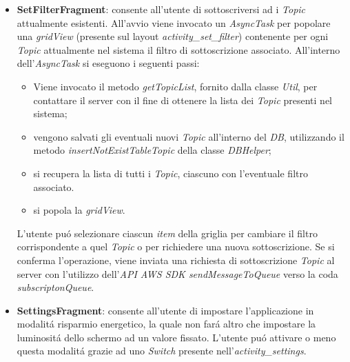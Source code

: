 \documentclass{article}
\begin{document}
\begin{itemize}
\item \textbf{SetFilterFragment}: consente all'utente di sottoscriversi ad i \textit{Topic} attualmente esistenti. All'avvio viene invocato un \textit{AsyncTask} per popolare una \textit{gridView} (presente sul layout \textit{activity\_set\_filter}) contenente per ogni \textit{Topic} attualmente nel sistema il filtro di sottoscrizione associato. All'interno dell'\textit{AsyncTask} si eseguono i seguenti passi:
\begin{itemize}
\item 	Viene invocato il metodo \textit{getTopicList}, fornito dalla classe \textit{Util}, per contattare il server con il fine di ottenere la lista dei \textit{Topic} presenti nel sistema;
\item	vengono salvati gli eventuali nuovi \textit{Topic} all'interno del \textit{DB}, utilizzando il metodo \textit{insertNotExistTableTopic} della classe \textit{DBHelper};
\item	si recupera la lista di tutti i \textit{Topic}, ciascuno con l'eventuale filtro associato.
\item si popola la \textit{gridView}.
\end{itemize}
L'utente pu\'o selezionare ciascun \textit{item} della griglia per cambiare il filtro corrispondente a quel \textit{Topic} o per richiedere una nuova sottoscrizione. Se si conferma l'operazione, viene inviata una richiesta di sottoscrizione \textit{Topic} al server con l'utilizzo dell'\textit{API AWS SDK sendMessageToQueue} verso la coda \textit{subscriptonQueue}.
\item \textbf{SettingsFragment}: consente all'utente di impostare l'applicazione in modalit\'a risparmio energetico, la quale non far\'a altro che impostare la luminosit\'a dello schermo ad un valore fissato. L'utente pu\'o attivare o meno questa modalit\'a grazie ad uno \textit{Switch} presente nell'\textit{activity\_settings}.
\end{itemize}
\end{document}
